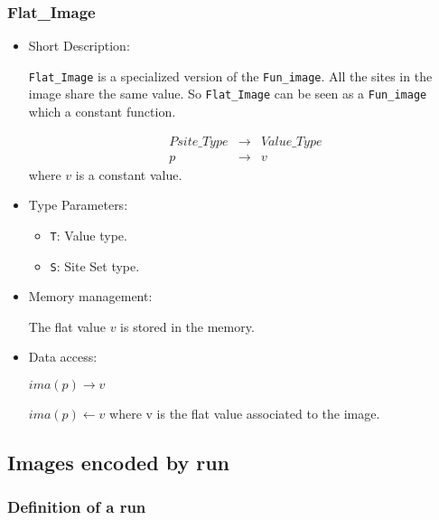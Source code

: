\subsubsection{Flat\_Image}

\begin{itemize}

\item{Short Description:}

\verb+Flat_Image+ is a specialized version of the \verb+Fun_image+.
All the sites in the image share the same value.
So \verb+Flat_Image+ can be seen as a \verb+Fun_image+ which a constant
function.

\begin{eqnarray*}
Psite\_Type & \rightarrow & Value\_Type \\
      p     &     \rightarrow & v
\end{eqnarray*} where $v$ is a constant value.

\item{Type Parameters:}

\begin{itemize}

\item \verb+T+: Value type.
\item \verb+S+: Site Set type.

\end{itemize}

\item{Memory management:}

The flat value $v$ is stored in the memory.

\item{Data access:}

$ima(p) \rightarrow v$

$ima(p) \leftarrow v$
where v is the flat value associated to the image.

\end{itemize}





\subsection{Images encoded by run}

\subsubsection{Definition of a run}

